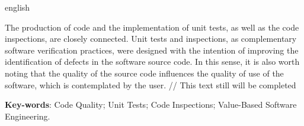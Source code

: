 \begin{resumo}[Abstract]
 \begin{otherlanguage*}{english}

   The production of code and the implementation of unit tests, as well as the code inspections, are closely connected. Unit tests and inspections, as complementary software verification practices, were designed with the intention of improving the identification of defects in the software source code. In this sense, it is also worth noting that the quality of the source code influences the quality of use of the software, which is contemplated by the user. // This text still will be completed

   \vspace{\onelineskip}
 
   \noindent 
   \textbf{Key-words}: Code Quality; Unit Tests; Code Inspections; Value-Based Software Engineering.
 \end{otherlanguage*}
\end{resumo}
